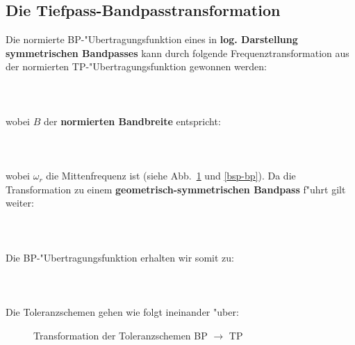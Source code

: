 \subsection{Die Tiefpass-Bandpasstransformation}
Die normierte BP-"Ubertragungsfunktion eines in {\bf log.
  Darstellung symmetrischen Bandpasses} kann durch folgende
Frequenztransformation aus der normierten TP-"Ubertragungsfunktion
gewonnen werden:\\~~\\
\\~~\\
wobei $B$ der {\bf normierten Bandbreite} entspricht:\\~~\\
\\~~\\
wobei $\omega_r$ die Mittenfrequenz ist (siehe Abb.~\ref{FIL_omega_B} und \ref{bsp-bp}). Da die Transformation zu einem {\bf geometrisch-symmetrischen Bandpass} f"uhrt gilt weiter:\\~~\\
\\~~\\
Die BP-"Ubertragungsfunktion erhalten wir somit zu:\\~~\\
\\~~\\ 
Die Toleranzschemen gehen wie folgt ineinander "uber:\\
\begin{figure}[!htb]
\vspace*{-3mm}
\begin{center}
  \caption{Transformation der Toleranzschemen BP $\longrightarrow$ TP}\label{FIL_omega_B} 
\end{center}
\vspace*{-6mm}
\end{figure}\\
